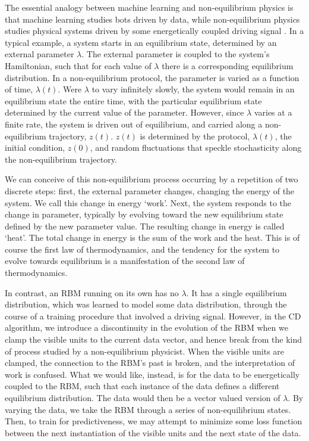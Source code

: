\documentclass[11pt, oneside]{article}   	%
\begin{document}
The essential analogy between machine learning and non-equilibrium physics is that machine learning studies bots driven by data, while non-equilibrium physics studies physical systems driven by some energetically coupled driving signal .  In a typical example, a system starts in an equilibrium state, determined by an external parameter $\lambda$.  The external parameter is coupled to the system's Hamiltonian, such that for each value of $\lambda$ there is a corresponding equilibrium distribution.  In a non-equilibrium protocol, the parameter is varied as a function of time, $\lambda (t)$.  Were $\lambda$ to vary infinitely slowly, the system would remain in an equilibrium state the entire time, with the particular equilibrium state determined by the current value of the parameter.  However, since $\lambda$ varies at a finite rate, the system is driven out of equilibrium, and carried along a non-equilibrium trajectory, $z(t)$.  $z(t)$ is determined by the protocol, $\lambda(t)$, the initial condition, $z(0)$, and random fluctuations that speckle stochasticity along the non-equilibrium trajectory.  

We can conceive of this non-equilibrium process occurring by a repetition of two discrete steps: first, the external parameter changes, changing the energy of the system.  We call this change in energy `work'.  Next, the system responds to the change in parameter, typically by evolving toward the new equilibrium state defined by the new parameter value.  The resulting change in energy is called `heat'.  The total change in energy is the sum of the work and the heat.  This is of course the first law of thermodynamics, and the tendency for the system to evolve towards equilibrium is a manifestation of the second law of thermodynamics.

In contrast, an RBM running on its own has no $\lambda$.  It has a single equilibrium distribution, which was learned to model some data distribution, through the course of a training procedure that involved a driving signal.  However, in the CD algorithm, we introduce a discontinuity in the evolution of the RBM when we clamp the visible units to the current data vector, and hence break from the kind of process studied by a non-equilibrium physicist.  When the visible units are clamped, the connection to the RBM's past is broken, and the interpretation of work is confused.  What we would like, instead, is for the data to be energetically coupled to the RBM, such that each instance of the data defines a different equilibrium distribution.  The data would then be a vector valued version of $\lambda$.  By varying the data, we take the RBM through a series of non-equilibrium states.  Then, to train for predictiveness, we may attempt to minimize some loss function between the next instantiation of the visible units and the next state of the data.
\end{document}
